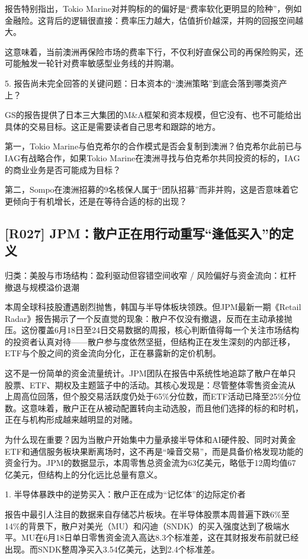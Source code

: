 \documentclass[11pt]{ctexart}
\begin{document}
报告特别指出，Tokio Marine对并购标的的偏好是“费率软化更明显的险种”，例如金融险。这背后的逻辑很直接：费率压力越大，估值折价越深，并购的回报空间越大。

这意味着，当前澳洲再保险市场的费率下行，不仅利好直保公司的再保险购买，还可能触发一轮针对费率敏感型业务线的并购潮。

5. 报告尚未完全回答的关键问题：日本资本的“澳洲策略”到底会落到哪类资产上？

GS的报告提供了日本三大集团的M\&A框架和资本规模，但它没有、也不可能给出具体的交易目标。这正是需要读者自己思考和跟踪的地方。

第一，Tokio Marine与伯克希尔的合作模式是否会复制到澳洲？伯克希尔此前已与IAG有战略合作，如果Tokio Marine在澳洲寻找与伯克希尔共同投资的标的，IAG的商业业务是否可能成为目标？

第二，Sompo在澳洲招募的9名核保人属于“团队招募”而非并购，这是否意味着它更倾向于有机增长，还是在等待合适的标的出现？

\subsection{[R027] JPM：散户正在用行动重写“逢低买入”的定义}
{\small\color{refgray}归类：美股与市场结构：盈利驱动但容错空间收窄 / 风险偏好与资金流向：杠杆撤退与规模溢价退潮}

本周全球科技股遭遇剧烈抛售，韩国与半导体板块领跌。但JPM最新一期《Retail Radar》报告揭示了一个反直觉的现象：散户不仅没有撤退，反而在主动承接抛压。这份覆盖6月18日至24日交易数据的周报，核心判断值得每一个关注市场结构的投资者认真对待——散户参与度依然坚挺，但结构正在发生深刻的内部迁移，ETF与个股之间的资金流向分化，正在暴露新的定价机制。

这不是一份简单的资金流量统计。JPM团队在报告中系统性地追踪了散户在单只股票、ETF、期权及主题篮子中的活动。其核心发现是：尽管整体零售资金流从上周高位回落，但个股交易活跃度仍处于65\%分位数，而ETF活动已降至25\%分位数。这意味着，散户正在从被动配置转向主动选股，而且他们选择的标的和时机，正在与机构形成越来越明显的对赌。

为什么现在重要？因为当散户开始集中力量承接半导体和AI硬件股、同时对黄金ETF和通信服务板块果断离场时，这不再是“噪音交易”，而是具备价格发现功能的资金行为。JPM的数据显示，本周零售总资金流为63亿美元，略低于12周均值67亿美元，但结构上的分化远比总量有意义。

1. 半导体暴跌中的逆势买入：散户正在成为“记忆体”的边际定价者

报告中最引人注目的数据来自存储芯片板块。在半导体股票本周普遍下跌6\%至14\%的背景下，散户对美光（MU）和闪迪（SNDK）的买入强度达到了极端水平。MU在6月18日单日零售资金流入高达8.3个标准差，这在其财报发布前就已经出现。而SNDK整周净买入3.54亿美元，达到2.4个标准差。
\end{document}
